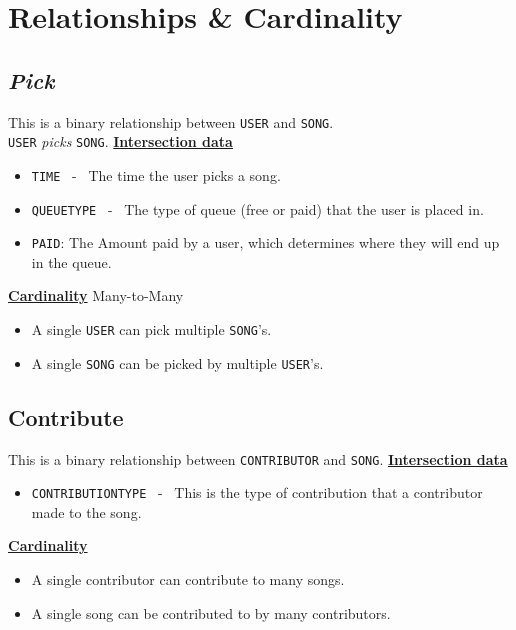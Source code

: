 \documentclass{report}
\begin{document}
\section{Relationships \& Cardinality}
\subsection{\textit{\textbf{Pick}}}
    This is a binary relationship between \texttt{USER} and \texttt{SONG}. \\
    \texttt{USER} \textit{picks} \texttt{SONG}.
    \bigbreak \noindent
    \underline{\textbf{Intersection data}}
    \begin{itemize}
        \item \texttt{TIME} \ - \ The time the user picks a song.
        \item \texttt{QUEUETYPE} \ - \ The type of queue (free or paid) that the user is placed in.
        \item \texttt{PAID}: The Amount paid by a user, which determines where they will end up in the queue.
    \end{itemize}
    \underline{\textbf{Cardinality}}
    \bigbreak \noindent
    Many-to-Many
    \begin{itemize}
        \item A single \texttt{USER} can pick multiple \texttt{SONG}'s.
        \item A single \texttt{SONG} can be picked by multiple \texttt{USER}'s.
    \end{itemize}
    \hline
    \subsection{Contribute}
    This is a binary relationship between \texttt{CONTRIBUTOR} and \texttt{SONG}.
    \bigbreak \noindent
    \underline{\textbf{Intersection data}}
    \begin{itemize}
        \item \texttt{CONTRIBUTIONTYPE} \ - \ This is the type of contribution that a contributor made to the song.
    \end{itemize}
    \underline{\textbf{Cardinality}}
    \begin{itemize}
        \item A single contributor can contribute to many songs.
        \item A single song can be contributed to by many contributors.
    \end{itemize}
\end{document}
